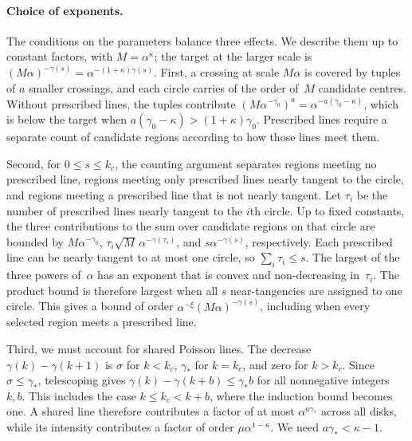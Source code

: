 \documentclass[11pt,letterpaper]{article}
\begin{document}
\paragraph{Choice of exponents.} The conditions on the parameters balance three effects. We describe them up to constant factors, with $M=\alpha^\kappa$; the target at the larger scale is $(M\alpha)^{-\gamma(s)}=\alpha^{-(1+\kappa)\gamma(s)}$. First, a crossing at scale $M\alpha$ is covered by tuples of $a$ smaller crossings, and each circle carries of the order of~$M$ candidate centres. Without prescribed lines, the tuples contribute $(M\alpha^{-\gamma_0})^a=\alpha^{-a(\gamma_0-\kappa)}$, which is below the target when $a(\gamma_0-\kappa)>(1+\kappa)\gamma_0$. Prescribed lines require a separate count of candidate regions according to how those lines meet them.

Second, for $0\le s\le k_c$, the counting argument separates regions meeting no prescribed line, regions meeting only prescribed lines nearly tangent to the circle, and regions meeting a prescribed line that is not nearly tangent. Let $\tau_i$ be the number of prescribed lines nearly tangent to the $i$th circle. Up to fixed constants, the three contributions to the sum over candidate regions on that circle are bounded by $M\alpha^{-\gamma_0}$, $\tau_i\sqrt M\,\alpha^{-\gamma(\tau_i)}$, and $s\alpha^{-\gamma(s)}$, respectively. Each prescribed line can be nearly tangent to at most one circle, so $\sum_i\tau_i\le s$. The largest of the three powers of~$\alpha$ has an exponent that is convex and non-decreasing in~$\tau_i$. The product bound is therefore largest when all $s$ near-tangencies are assigned to one circle. This gives a bound of order $\alpha^{-\xi}(M\alpha)^{-\gamma(s)}$, including when every selected region meets a prescribed line.

Third, we must account for shared Poisson lines. The decrease $\gamma(k)-\gamma(k+1)$ is $\sigma$ for $k<k_c$, $\gamma_*$ for $k=k_c$, and zero for $k>k_c$. Since $\sigma\le\gamma_*$, telescoping gives $\gamma(k)-\gamma(k+b)\le\gamma_*b$ for all nonnegative integers $k,b$. This includes the case $k\le k_c<k+b$, where the induction bound becomes one. A shared line therefore contributes a factor of at most $\alpha^{a\gamma_*}$ across all disks, while its intensity contributes a factor of order $\mu\alpha^{1-\kappa}$. We need $a\gamma_*<\kappa-1$.
\end{document}
